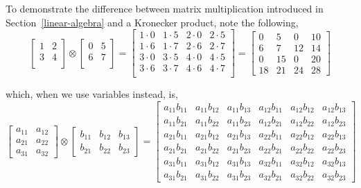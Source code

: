 To demonstrate the difference between matrix multiplication introduced in Section~\ref{linear-algebra} and a Kronecker product, note the following,
\[
\begin{bmatrix}
	1 & 2 \\
	3 & 4 \\
\end{bmatrix}
\otimes
\begin{bmatrix}
      0 & 5 \\
      6 & 7 \\
\end{bmatrix} =
\begin{bmatrix}
	1\cdot 0 & 1\cdot 5 & 2\cdot 0 & 2\cdot 5 \\
	1\cdot 6 & 1\cdot 7 & 2\cdot 6 & 2\cdot 7 \\      
	3\cdot 0 & 3\cdot 5 & 4\cdot 0 & 4\cdot 5 \\      
	3\cdot 6 & 3\cdot 7 & 4\cdot 6 & 4\cdot 7 \\    
\end{bmatrix}  =
\begin{bmatrix}
	0 & 5 & 0 & 10 \\      
	6 & 7 & 12 & 14 \\     
	0 & 15 & 0 & 20 \\     
	18 & 21 & 24 & 28
\end{bmatrix}
\]

which, when we use variables instead, is,
\[
\begin{bmatrix} a_{11} & a_{12} \\ a_{21} & a_{22} \\ a_{31} & a_{32} \end{bmatrix} \otimes \begin{bmatrix} b_{11} & b_{12} & b_{13} \\ b_{21} & b_{22} & b_{23} \end{bmatrix} = \begin{bmatrix} a_{11} b_{11} & a_{11} b_{12} & a_{11} b_{13} & a_{12} b_{11} & a_{12} b_{12} & a_{12} b_{13} \\ a_{11} b_{21} & a_{11} b_{22} & a_{11} b_{23} & a_{12} b_{21} & a_{12} b_{22} & a_{12} b_{23} \\ a_{21} b_{11} & a_{21} b_{12} & a_{21} b_{13} & a_{22} b_{11} & a_{22} b_{12} & a_{22} b_{13} \\ a_{21} b_{21} & a_{21} b_{22} & a_{21} b_{23} & a_{22} b_{21} & a_{22} b_{22} & a_{22} b_{23} \\ a_{31} b_{11} & a_{31} b_{12} & a_{31} b_{13} & a_{32} b_{11} & a_{32} b_{12} & a_{32} b_{13} \\ a_{31} b_{21} & a_{31} b_{22} & a_{31} b_{23} & a_{32} b_{21} & a_{32} b_{22} & a_{32} b_{23} \end{bmatrix}
\]

